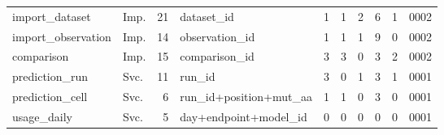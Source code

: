 {{\begin{tabular}{llrlrrrrrr}
import\_dataset & Imp. & 21 & dataset\_\allowbreak{}id & 1 & 1 & 2 & 6 & 1 & 0002 \\
import\_observation & Imp. & 14 & observation\_\allowbreak{}id & 1 & 1 & 1 & 9 & 0 & 0002 \\
comparison & Imp. & 15 & comparison\_\allowbreak{}id & 3 & 3 & 0 & 3 & 2 & 0002 \\
prediction\_run & Svc. & 11 & run\_\allowbreak{}id & 3 & 0 & 1 & 3 & 1 & 0001 \\
prediction\_cell & Svc. & 6 & run\_\allowbreak{}id+position+mut\_\allowbreak{}aa & 1 & 1 & 0 & 3 & 0 & 0001 \\
usage\_daily & Svc. & 5 & day+endpoint+model\_\allowbreak{}id & 0 & 0 & 0 & 0 & 0 & 0001 \\
\bottomrule
\end{tabular}}}
